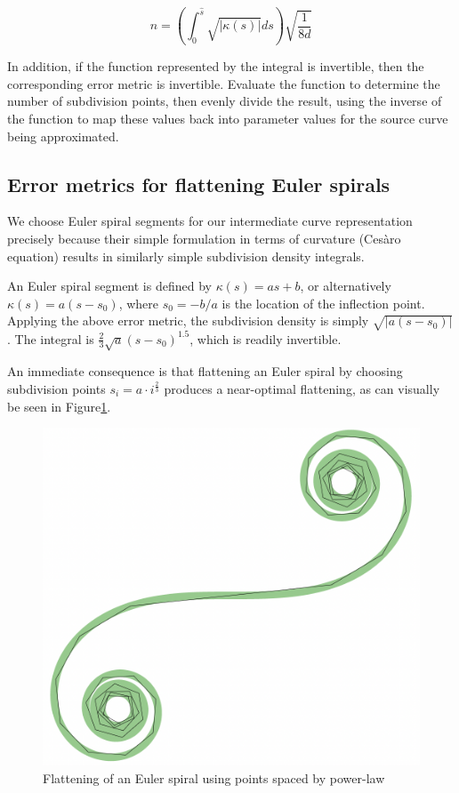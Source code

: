 \documentclass[format=acmsmall]{acmart}
\begin{document}
\[
    n = \left(\int_0^{\hat{s}} \sqrt{|\kappa(s)|}ds \right)\sqrt{\frac{1}{8d}}
\]

In addition, if the function represented by the integral is invertible, then the corresponding error metric is invertible. Evaluate the function to determine the number of subdivision points, then evenly divide the result, using the inverse of the function to map these values back into parameter values for the source curve being approximated.

\subsection{Error metrics for flattening Euler spirals}

We choose Euler spiral segments for our intermediate curve representation precisely because their simple formulation in terms of curvature (Cesàro equation) results in similarly simple subdivision density integrals.

An Euler spiral segment is defined by $\kappa(s) = as+b$, or alternatively $\kappa(s) = a(s-s_0)$, where $s_0 = -b/a$ is the location of the inflection point. Applying the above error metric, the subdivision density is simply $\sqrt{|a(s-s_0)|}$. The integral is $\frac{2}{3}\sqrt{a}(s-s_0)^1.5$, which is readily invertible.

An immediate consequence is that flattening an Euler spiral by choosing subdivision points $s_i = a\cdot i^\frac{2}{3}$ produces a near-optimal flattening, as can visually be seen in Figure\ref{fig:es_flatten}.

\begin{figure}
    \includegraphics[scale=0.3]{es_flatten}
    \caption{Flattening of an Euler spiral using points spaced by power-law}
    \label{fig:es_flatten}
\end{figure}
\end{document}
